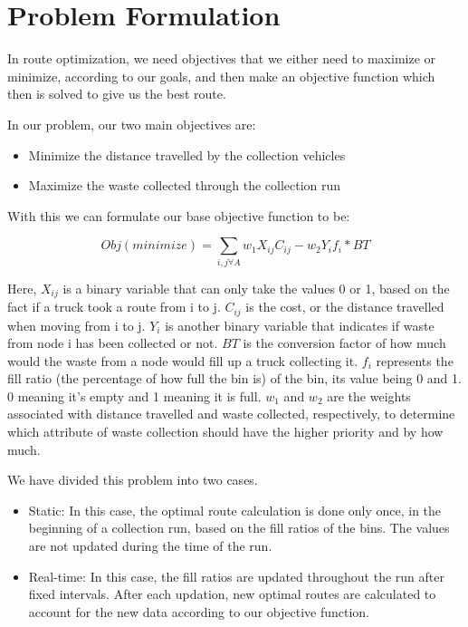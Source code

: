 \documentclass[12pt]{article}
\begin{document}
\section{Problem Formulation}

In route optimization, we need objectives that we either need to maximize or minimize, according to our goals, and then make an objective function which then is solved to give us the best route. 

In our problem, our two main objectives are:
\begin{itemize}
    \item Minimize the distance travelled by the collection vehicles
    \item Maximize the waste collected through the collection run
\end{itemize}

With this we can formulate our base objective function to be:

\begin{equation}\label{eq1}
    Obj(minimize)=\sum_{i,j \forall A} w_1 X_{ij} C_{ij} - w_2 Y_i f_i * BT
\end{equation}

Here, $X_{ij}$ is a binary variable that can only take the values 0 or 1, based on the fact if a truck took a route from i to j. $C_{ij}$ is the cost, or the distance travelled when moving from i to j. $Y_{i}$ is another binary variable that indicates if waste from node i has been collected or not. $BT$ is the conversion factor of how much would the waste from a node would fill up a truck collecting it. $f_i$ represents the fill ratio (the percentage of how full the bin is) of the bin, its value being 0 and 1. 0 meaning it's empty and 1 meaning it is full. $w_1$ and $w_2$ are the weights associated with distance travelled and waste collected, respectively, to determine which attribute of waste collection should have the higher priority and by how much. 

We have divided this problem into two cases.
\begin{itemize}
    \item Static: In this case, the optimal route calculation is done only once, in the beginning of a collection run, based on the fill ratios of the bins. The values are not updated during the time of the run.
    \item Real-time: In this case, the fill ratios are updated throughout the run after fixed intervals. After each updation, new optimal routes are calculated to account for the new data according to our objective function.
\end{itemize}
\end{document}
